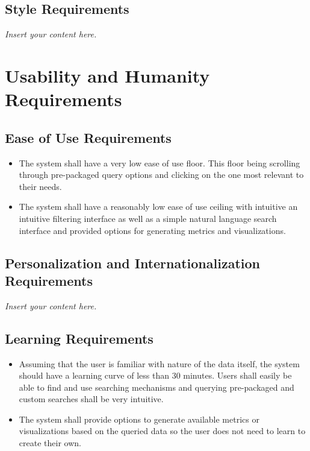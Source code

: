\documentclass[12pt]{article}
\newcommand{\lips}{\textit{Insert your content here.}}
\begin{document}
\subsection{Style Requirements}
\lips

\section{Usability and Humanity Requirements}



\subsection{Ease of Use Requirements}

\begin{itemize}
    \item The system shall have a very low ease of use floor. This floor being scrolling through
    pre-packaged query options and clicking on the one most relevant to their needs.
    \item The system shall have a reasonably low ease of use ceiling with intuitive an intuitive filtering interface
    as well as a simple natural language search interface and provided options for generating metrics and visualizations.
\end{itemize}

\subsection{Personalization and Internationalization Requirements}
\lips



\subsection{Learning Requirements}

\begin{itemize}
    \item Assuming that the user is familiar with nature of the data itself, the system should
    have a learning curve of less than 30 minutes. Users shall easily be able to find and use searching
    mechanisms and querying pre-packaged and custom searches shall be very intuitive.
    \item The system shall provide options to generate available metrics or visualizations based on the queried
    data so the user does not need to learn to create their own.
\end{itemize}
\end{document}
